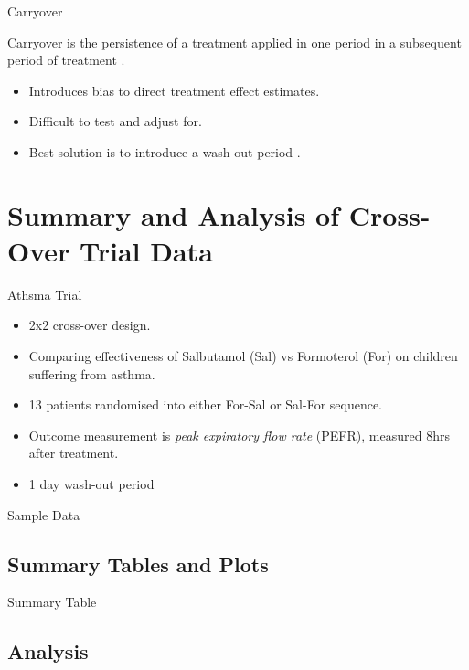 \documentclass{beamer}
\begin{document}
\begin{frame}{Carryover}
    \begin{definition}
        Carryover is the persistence of a treatment applied in one period in a subsequent period of treatment \cite{senn2002crossover}.
    \end{definition}
    \begin{itemize}
        \item Introduces bias to direct treatment effect estimates.
        \item Difficult to test and adjust for.
        \item Best solution is to introduce a wash-out period \cite{senn2002crossover}.
    \end{itemize}
\end{frame}

\section{Summary and Analysis of Cross-Over Trial Data}

\begin{frame}{Athsma Trial}
    \begin{itemize}
        \item 2x2 cross-over design.
        \item Comparing effectiveness of Salbutamol (Sal) vs Formoterol (For) on children suffering from asthma.
        \item 13 patients randomised into either For-Sal or Sal-For sequence.
        \item Outcome measurement is \textit{peak expiratory flow rate} (PEFR), measured 8hrs after treatment.
        \item 1 day wash-out period
    \end{itemize}
\end{frame}

\begin{frame}{Sample Data}
    
\end{frame}

\subsection{Summary Tables and Plots}

\begin{frame}{Summary Table}
\end{frame}

\subsection{Analysis}
\end{document}
